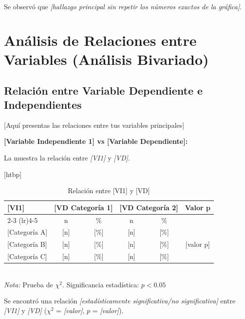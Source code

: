 Se observó que \textit{{[hallazgo principal sin repetir los números exactos de la gráfica]}}.

\section{Análisis de Relaciones entre Variables (Análisis Bivariado)}
\label{sec:analisis_bivariado}

\subsection{Relación entre Variable Dependiente e Independientes}
\label{subsec:relacion_variables_principales}

{[Aquí presentas las relaciones entre tus variables principales]}

\textbf{{[Variable Independiente 1]} vs {[Variable Dependiente]}:}

La  muestra la relación entre \textit{{[VI1]}} y \textit{{[VD]}}.

\begin{table}{[htbp]}
    \centering
    \caption{Relación entre {[VI1]} y {[VD]}}
    \label{tab:relacion_vi1_vd}
    \begin{tabular}{@{}lccccc@{}}
        \toprule
        \textbf{{[VI1]}} & \multicolumn{2}{c}{\textbf{{[VD Categoría 1]}}} & \multicolumn{2}{c}{\textbf{{[VD Categoría 2]}}} & \textbf{Valor p} \\
        \cmidrule(lr){2-3} \cmidrule(lr){4-5}
         & n & \% & n & \% & \\
        \midrule
        {[Categoría A]} & {[n]} & [\%] & {[n]} & [\%] & \multirow{3}{*}{{[valor p]}} \\
        {[Categoría B]} & {[n]} & [\%] & {[n]} & [\%] & \\
        {[Categoría C]} & {[n]} & [\%] & {[n]} & [\%] & \\
        \bottomrule
    \end{tabular}
    \\[5pt]
    \footnotesize{\textit{Nota:} Prueba de $\chi^2$. Significancia estadística: $p < 0.05$}
\end{table}

Se encontró una relación \textit{{[estadísticamente significativa/no significativa]}} entre \textit{{[VI1]}} y \textit{{[VD]}} ($\chi^2$ = \textit{{[valor]}}, $p$ = \textit{{[valor]}}).

